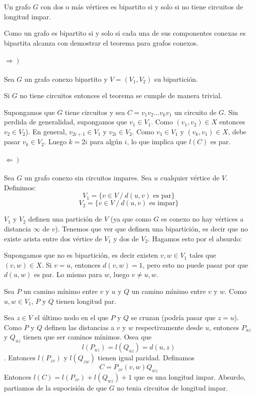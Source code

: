 \begin{theorem}
	Un grafo \(G\) con dos o más vértices es bipartito si y solo si no tiene circuitos de longitud impar.
\end{theorem}
\begin{demo}
	Como un grafo es bipartito si y solo si cada una de sus componentes conexas es bipartita alcanza con demostrar el teorema para grafos conexos. 
	\paragraph{\(\left.\Rightarrow\right) \)} Sea \(G\) un grafo conexo bipartito y \(V = (V_1,V_2)\) su bipartición.
	
	Si \(G\) no tiene circuitos entonces el teorema se cumple de manera trivial.
	
	Supongamos que \(G\) tiene circuitos y sea \(C = v_1v_2\dots v_kv_1\) un circuito de \(G\). Sin perdida de generalidad, supongamos que \(v_1\in V_1\). Como \((v_1,v_2) \in X\) entonces \(v_2\in V_2\)). En general, \(v_{2i + 1}\in V_1\) y \(v_{2i}\in V_2\). Como \(v_1\in V_1\) y \((v_k,v_1)\in X\), debe pasar \(v_k\in V_2\). Luego \(k = 2i\) para algún \(i\), lo que implica que \(l(C)\) es par.
\end{demo}
\begin{demoPart}
	
	\paragraph{\(\left.\Leftarrow\right)\)} Sea \(G\) un grafo conexo sin circuitos impares. Sea \(u\) cualquier vértice de \(V\). Definimos: \[V_1 = \{ v\in V~/~d(u,v) \text{ es par}\}\] \[V_2 = \{ v\in V~/~d(u,v) \text{ es impar}\}\]

	\(V_1\) y \(V_2\) definen una partición de \(V\) (ya que como \(G\) es conexo no hay vértices a distancia \(\infty\) de \(v\)). Tenemos que ver que definen una bipartición, es decir que no existe arista entre dos vértice de \(V_1\) y dos de \(V_2\). Hagamos esto por el absurdo:
	
	Supongamos que no es bipartición, es decir existen \(v,w\in V_1\) tales que \((v,w)\in X\). Si \(v = u\), entonces \(d(v,w) = 1\), pero esto no puede pasar por que \(d(u,w) \) es par. Lo mismo para \(w\), luego \(v\neq u,w\).
	
	Sea \(P\) un camino mínimo entre \(v\) y \(u\) y \(Q\) un camino mínimo entre \(v\) y \(w\). Como \(u,w\in V_1\), \(P\) y \(Q\) tienen longitud par.
	
	Sea \(z\in V\) el último nodo en el que \(P\) y \(Q\) se cruzan (podría pasar que \(z = u\)). Como \(P\) y \(Q\) definen las distancias a \(v\) y \(w\) respectivamente desde \(u\), entonces \(P_{uz}\) y \(Q_{uz}\) tienen que ser caminos mínimos. Osea que \[l(P_{uz}) = l(Q_{uz}) = d(u,z)\].
	Entonces \(l(P_{zv})\) y \(l(Q_{zw})\) tienen igual paridad. Definamos \[C = P_{zv}(v,w)Q_{wz}\]
	Entonces \(l(C) = l(P_{zv}) + l(Q_{wz}) + 1\) que es una longitud impar. Absurdo, partiamos de la supocisión de que \(G\) no tenia circuitos de longitud impar.
\end{demoPart}

